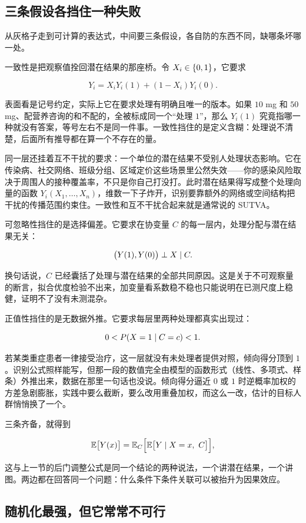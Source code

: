 \subsection{三条假设各挡住一种失败}

从灰格子走到可计算的表达式，中间要三条假设，各自防的东西不同，缺哪条坏哪一处。

一致性是把观察值拴回潜在结果的那座桥。令 \(X_i\in\left\{0,1\right\}\)，它要求

\[
Y_i=X_iY_i(1)+(1-X_i)Y_i(0).
\]

表面看是记号约定，实际上它在要求处理有明确且唯一的版本。如果 \(10\) mg 和 \(50\) mg、配营养咨询的和不配的，全被标成同一个``处理 \(1\)''，那么 \(Y_i(1)\) 究竟指哪一种就没有答案，等号左右不是同一件事。一致性挡住的是定义含糊：处理说不清楚，后面所有推导都在算一个不存在的量。

同一层还挂着互不干扰的要求：一个单位的潜在结果不受别人处理状态影响。它在传染病、社交网络、班级分组、区域定价这些场景里公然失效——你的感染风险取决于周围人的接种覆盖率，不只是你自己打没打。此时潜在结果得写成整个处理向量的函数 \(Y_i(X_1,\ldots,X_n)\)，维数一下子炸开，识别要靠额外的网络或空间结构把干扰的传播范围约束住。一致性和互不干扰合起来就是通常说的 SUTVA。

可忽略性挡住的是选择偏差。它要求在协变量 \(C\) 的每一层内，处理分配与潜在结果无关：

\[
\bigl(Y(1),Y(0)\bigr)\perp X\mid C.
\]

换句话说，\(C\) 已经囊括了处理与潜在结果的全部共同原因。这是关于不可观察量的断言，拟合优度检验不出来，加变量看系数稳不稳也只能说明在已测尺度上稳健，证明不了没有未测混杂。

正值性挡住的是无数据外推。它要求每层里两种处理都真实出现过：

\[
0<P(X=1\mid C=c)<1.
\]

若某类重症患者一律接受治疗，这一层就没有未处理者提供对照，倾向得分顶到 \(1\)。识别公式照样能写，但那一段的数值完全由模型的函数形式（线性、多项式、样条）外推出来，数据在那里一句话也没说。倾向得分逼近 \(0\) 或 \(1\) 时逆概率加权的方差急剧膨胀，实践中要么截断，要么改用重叠加权，而这么一改，估计的目标人群悄悄换了一个。

三条齐备，就得到

\[
\mathbb{E}\bigl[Y(x)\bigr]=\mathbb{E}_C\Bigl[\mathbb{E}\bigl[Y\mid X=x,\ C\bigr]\Bigr],
\]

这与上一节的后门调整公式是同一个结论的两种说法，一个讲潜在结果，一个讲图。两边都在回答同一个问题：什么条件下条件关联可以被抬升为因果效应。

\subsection{随机化最强，但它常常不可行}

